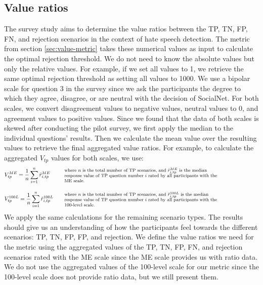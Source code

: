 \subsection{Value ratios}
\label{sec:analysis-values}
The survey study aims to determine the value ratios between the TP, TN, FP, FN, and rejection scenarios in the context of hate speech detection.
%
The metric from section \ref{sec:value-metric} takes these numerical values as input to calculate the optimal rejection threshold.
%
We do not need to know the absolute values but only the relative values.
%
For example, if we set all values to 1, we retrieve the same optimal rejection threshold as setting all values to 1000.
%
We use a bipolar scale for question 3 in the survey since we ask the participants the degree to which they agree, disagree, or are neutral with the decision of SocialNet.
%
For both scales, we convert disagreement values to negative values, neutral values to 0, and agreement values to positive values.
%
Since we found that the data of both scales is skewed after conducting the pilot survey, we first apply the median to the individual questions' results.
%
Then we calculate the mean value over the resulting values to retrieve the final aggregated value ratios.
%
For example, to calculate the aggregated $V_{tp}$ values for both scales, we use:
\begin{align*}
     & V_{tp}^{ME} = \frac{1}{n} \sum_{i=1}^{n} \tilde{r}_{i, tp}^{ME}     & \quad  \parbox{35em}{\footnotesize where $n$ is the total number of TP scenarios, and $\tilde{r}_{i, tp}^{ME}$ is the median   \\response value of TP question number $i$ rated by all participants with the \\ME scale.}         \\[10pt]
     & V_{tp}^{100L} = \frac{1}{n} \sum_{i=1}^{n} \tilde{r}_{i, tp}^{100L} & \quad  \parbox{35em}{\footnotesize where $n$ is the total number of TP scenarios, and $\tilde{r}_{i, tp}^{100L}$ is the median \\response value of TP question number $i$ rated by all participants with the \\100-level scale.}
\end{align*}
%
We apply the same calculations for the remaining scenario types.
%
The results should give us an understanding of how the participants feel towards the different scenarios: TP, TN, FP, FP, and rejection.
%
We define the value ratios we need for the metric using the aggregated values of the TP, TN, FP, FN, and rejection scenarios rated with the ME scale since the ME scale provides us with ratio data.
%
We do not use the aggregated values of the 100-level scale for our metric since the 100-level scale does not provide ratio data, but we still present them.

